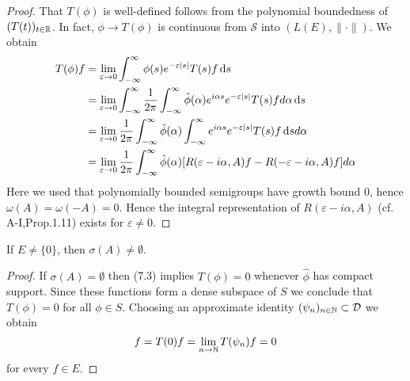\begin{proof}
That $T(\phi)$ is well-defined follows from the polynomial boundedness of $(T(t))_{t\in\mathbb{R}}$.
In fact, $\phi \to T(\phi)$ is continuous from $\mathcal{S}$ into $(L(E),\|\cdot\|)$.
We obtain
\begin{align*}
T(\phi)f &= \lim_{\varepsilon\to 0} \int_{-\infty}^{\infty} \phi(s)e^{-\varepsilon|s|}T(s)f \mathop{}\!\mathrm{d}{s} \\
&= \lim_{\varepsilon\to 0} \int_{-\infty}^{\infty} \frac{1}{2\pi}\int_{-\infty}^{\infty} \hat{\phi}(\alpha)e^{i\alpha s}e^{-\varepsilon|s|}T(s)f d\alpha \mathop{}\!\mathrm{d}{s} \\
&= \lim_{\varepsilon\to 0} \frac{1}{2\pi}\int_{-\infty}^{\infty} \hat{\phi}(\alpha)\int_{-\infty}^{\infty} e^{i\alpha s}e^{-\varepsilon|s|}T(s)f \mathop{}\!\mathrm{d}{s} d\alpha \\
&= \lim_{\varepsilon\to 0} \frac{1}{2\pi}\int_{-\infty}^{\infty} \hat{\phi}(\alpha)[R(\varepsilon-i\alpha,A)f - R(-\varepsilon-i\alpha,A)f] d\alpha
\end{align*}
Here we used that polynomially bounded semigroups have growth bound $0$, hence $\omega(A) = \omega(-A) = 0$.
Hence the integral representation of $R(\varepsilon-i\alpha,A)$ (cf. A-I,Prop.1.11) exists for $\varepsilon \neq 0$.
\end{proof}
\begin{lemma}\label{lem:a3-7.6}
If $E \neq \{0\}$, then $\sigma(A) \neq \emptyset$.
\end{lemma}
\begin{proof}
If $\sigma(A) = \emptyset$ then (7.3) implies $T(\phi) = 0$ whenever $\hat{\phi}$ has compact support.
Since these functions form a dense subspace of $S$ we conclude that $T(\phi) = 0$ for all $\phi \in S$.
Choosing an approximate identity $(\psi_{n})_{n\in\mathbb{N}} \subset \mathcal{D}$ we obtain
\[
f = T(0)f = \lim_{n\to\mathbb{N}} T(\psi_{n})f = 0
\]
for every $f \in E$.
\end{proof}
